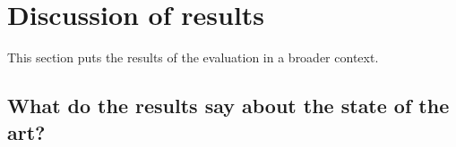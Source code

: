 \section{Discussion of results}\label{sec:evaluation-discussion-of-results}

This section puts the results of the evaluation in a broader context.

\subsection{What do the results say about the state of the art?}


%
%
%
%
%
